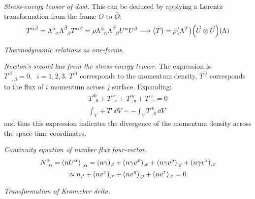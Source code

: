 \documentclass{report}
\begin{document}
\begin{subquests}
	\item \emph{Stress-energy tensor of dust.}
	This can be deduced by applying a Lorentz transformation from the frame $O$ to $\bar O$:
	\begin{gather*}
		T^{\bar \alpha \bar \beta} = \Lambda^{\bar \alpha}_{\;\;\alpha}\Lambda^{\bar \beta}_{\;\;\beta} T^{\alpha\beta} = \rho \Lambda^{\bar \alpha}_{\;\;\alpha}\Lambda^{\bar \beta}_{\;\;\beta} U^{\alpha} U^{\beta} \longrightarrow \pqty{\bar T} = \rho\pqty{\Lambda^T}\pqty{\vec U \otimes \vec U}\pqty{\Lambda}
	\end{gather*}

	\item \emph{Thermodynamic relations as one-forms.}

	\item \emph{Newton's second law from the stress-energy tensor.}
	The expression is $T^{i\beta}_{\;\;\;,\beta} = 0, \;\; i = 1,2,3$. $T^{i0}$ corresponds to the momentum density, $T^{ij}$ corresponds to the flux of $i$ momentum across $j$ surface. Expanding:
	\begin{gather*}
		T^{i0}_{\;,0} + T^{ix}_{\;,x} + T^{iy}_{\;,y} + T^{iz}_{\;,z} = 0 \\
		\int_{V} \div{T^i}\,\dd{V} = -\int_V T^{i0}_{\;,0}\,\dd{V}
	\end{gather*}
	and thus this expression indicates the divergence of the momentum density across the space-time coordinates.

	\item \emph{Continuity equation of number flux four-vector.}
	\begin{gather*}
		N^{\alpha}_{\;,\alpha} = \pqty{nU^{\alpha}}_{\;,\alpha} = (n\gamma)_{,t} + (n\gamma v^x)_{,x} + (n\gamma v^y)_{,y} + (n\gamma v^z)_{,z} \\
		 \approx n_{,t} + (nv^x)_{,x} + (nv^y)_{,y} + (nv^z)_{,z} = 0
	\end{gather*}

	\item \emph{Transformation of Kronecker delta.}
	\begin{subquests}
		\item

		\item
	\end{subquests}


\end{subquests}
\end{document}
